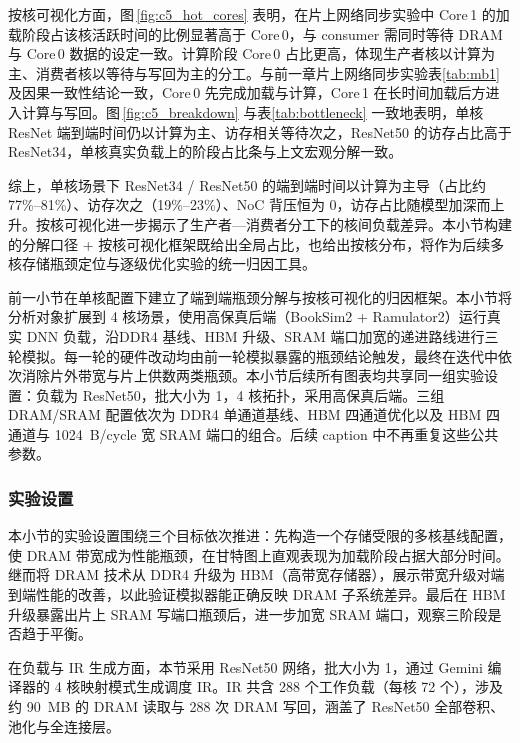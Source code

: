 按核可视化方面，图\,\ref{fig:c5_hot_cores} 表明，在片上网络同步实验中 Core\,1 的加载阶段占该核活跃时间的比例显著高于 Core\,0，与 consumer 需同时等待 DRAM 与 Core\,0 数据的设定一致。计算阶段 Core\,0 占比更高，体现生产者核以计算为主、消费者核以等待与写回为主的分工。与前一章片上网络同步实验表\ref{tab:mb1} 及因果一致性结论一致，Core\,0 先完成加载与计算，Core\,1 在长时间加载后方进入计算与写回。图\,\ref{fig:c5_breakdown} 与表\ref{tab:bottleneck} 一致地表明，单核 ResNet 端到端时间仍以计算为主、访存相关等待次之，ResNet50 的访存占比高于 ResNet34，单核真实负载上的阶段占比条与上文宏观分解一致。

综上，单核场景下 ResNet34 / ResNet50 的端到端时间以计算为主导（占比约 77\%--81\%）、访存次之（19\%--23\%）、NoC 背压恒为 0，访存占比随模型加深而上升。按核可视化进一步揭示了生产者—消费者分工下的核间负载差异。本小节构建的分解口径 + 按核可视化框架既给出全局占比，也给出按核分布，将作为后续多核存储瓶颈定位与逐级优化实验的统一归因工具。

\label{subsec:c4_multicore}\label{subsec:c5_multicore}

前一小节在单核配置下建立了端到端瓶颈分解与按核可视化的归因框架。本小节将分析对象扩展到 4 核场景，使用高保真后端（BookSim2 + Ramulator2）运行真实 DNN 负载，沿DDR4 基线、HBM 升级、SRAM 端口加宽的递进路线进行三轮模拟。每一轮的硬件改动均由前一轮模拟暴露的瓶颈结论触发，最终在迭代中依次消除片外带宽与片上供数两类瓶颈。本小节后续所有图表均共享同一组实验设置：负载为 ResNet50，批大小为 1，4 核拓扑，采用高保真后端。三组 DRAM/SRAM 配置依次为 DDR4 单通道基线、HBM 四通道优化以及 HBM 四通道与 \SI{1024}{B/cycle} 宽 SRAM 端口的组合。后续 caption 中不再重复这些公共参数。

\subsubsection{实验设置}

本小节的实验设置围绕三个目标依次推进：先构造一个存储受限的多核基线配置，使 DRAM 带宽成为性能瓶颈，在甘特图上直观表现为加载阶段占据大部分时间。继而将 DRAM 技术从 DDR4 升级为 HBM（高带宽存储器），展示带宽升级对端到端性能的改善，以此验证模拟器能正确反映 DRAM 子系统差异。最后在 HBM 升级暴露出片上 SRAM 写端口瓶颈后，进一步加宽 SRAM 端口，观察三阶段是否趋于平衡。

在负载与 IR 生成方面，本节采用 ResNet50 网络，批大小为 1，通过 Gemini 编译器的 4 核映射模式生成调度 IR。IR 共含 288 个工作负载（每核 72 个），涉及约 \SI{90}{MB} 的 DRAM 读取与 288 次 DRAM 写回，涵盖了 ResNet50 全部卷积、池化与全连接层。

